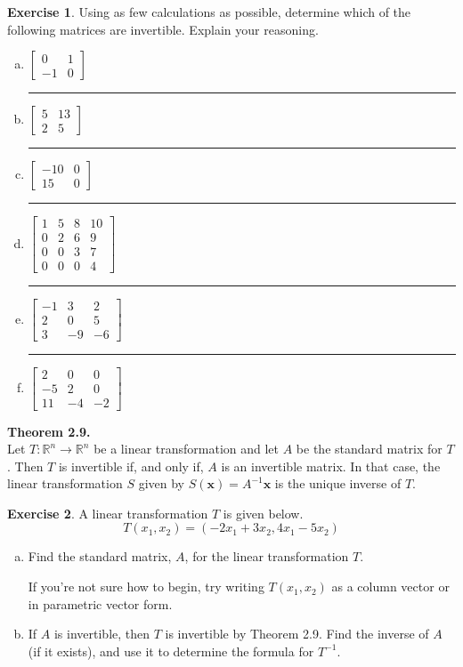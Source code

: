 \documentclass[10pt]{book}
\newcommand{\boxcolor}{gray!30}
\newenvironment{boxthm}{\begin{mdframed}[backgroundcolor=\boxcolor,nobreak=true]}{\end{mdframed}}
\theoremstyle{definition}
\newtheorem{exercise}{Exercise}[section]
\newcommand{\R}{\mathbb{R}}
\newcommand{\vect}[1]{\ensuremath{\boldsymbol{\mathbf{#1}}}}
\newcommand{\Tmap}[2]{T:\R^{#1}\to\R^{#2}}
\begin{document}
\begin{exercise} %
	Using as few calculations as possible, determine which of the following matrices are invertible. Explain your reasoning.
	\begin{enumerate}[(a)]
		\item $\begin{bmatrix}0&1\\-1&0\end{bmatrix}$ \vfill\hrule\vfill
		\item $\begin{bmatrix}5&13\\2&5\end{bmatrix}$ \vfill\hrule\vfill
		\item $\begin{bmatrix}-10&0\\15&0\end{bmatrix}$ \vfill\hrule\vfill
		\item $\begin{bmatrix}1&5&8&10\\0&2&6&9\\0&0&3&7\\0&0&0&4\end{bmatrix}$ \vfill\hrule\vfill
		\item $\begin{bmatrix}-1&3&2\\2&0&5\\3&-9&-6\end{bmatrix}$ \vfill\hrule\vfill
		\item $\begin{bmatrix}2&0&0\\-5&2&0\\11&-4&-2\end{bmatrix}$ \vfill
	\end{enumerate}
\end{exercise}


\newpage


\begin{boxthm}
	\textbf{Theorem 2.9.} \\
	Let $\Tmap{n}{n}$ be a linear transformation and let $A$ be the standard matrix for $T$. Then $T$ is invertible if, and only if, $A$ is an invertible matrix. In that case, the linear transformation $S$ given by $S(\vect{x})=A^{-1}\vect{x}$ is the unique inverse of $T$.
\end{boxthm}

\begin{exercise} %
	A linear transformation $T$ is given below.
	$$ T(x_1,x_2) = (-2x_1+3x_2,4x_1-5x_2) $$
	\begin{enumerate}[(a)]
		\item Find the standard matrix, $A$, for the linear transformation $T$. \par
		If you're not sure how to begin, try writing $T(x_1,x_2)$ as a column vector or in parametric vector form.
		\vfill
		\item If $A$ is invertible, then $T$ is invertible by Theorem 2.9. Find the inverse of $A$ (if it exists), and use it to determine the formula for $T^{-1}$.
		\vfill
	\end{enumerate}
\end{exercise}
\end{document}
